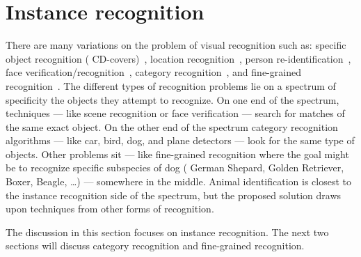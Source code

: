 
\section{Instance recognition}\label{sec:ir}
    There are many variations on the problem of visual recognition such as:
    specific object recognition (\eg{} CD-covers)~\cite{lowe_distinctive_2004, sivic_efficient_2009,
      nister_scalable_2006},
    location recognition~\cite{jegou_hamming_2008,jegou_aggregating_2012,tolias_aggregate_2013},
    person re-identification~\cite{shi_embedding_2016,karanam_person_2015,wu_viewpoint_2015},
    face verification/recognition~\cite{chopra_learning_2005, huang_labeled_2007, berg_tom_vs_pete_2012,
      chen_blessing_2013, taigman_deepface_2014, schroff_facenet_2015},
    category recognition~\cite{lazebnik_beyond_2006,zhang_local_2006,mccann_local_2012,boiman_defense_2008},
    and fine-grained recognition~\cite{parkhi_cats_2012,berg_poof_2013, gavves_local_2014}.
    The different types of recognition problems lie on a spectrum of specificity \wrt{} the objects they attempt
      to recognize.
    On one end of the spectrum,  techniques --- like scene recognition or face
      verification --- search for matches of the same exact object.
    On the other end of the spectrum category recognition algorithms --- like car, bird, dog, and plane detectors
      --- look for the same type of objects.
    Other problems sit --- like fine-grained recognition where the goal might be to recognize specific subspecies
      of dog (\eg{} German Shepard, Golden Retriever, Boxer, Beagle, \ldots{}) --- somewhere in the middle.
    Animal identification is closest to the instance recognition side of the spectrum, but the proposed solution
      draws upon techniques from other forms of recognition.

    The discussion in this section focuses on instance recognition.
    The next two sections will discuss category recognition and fine-grained recognition.

